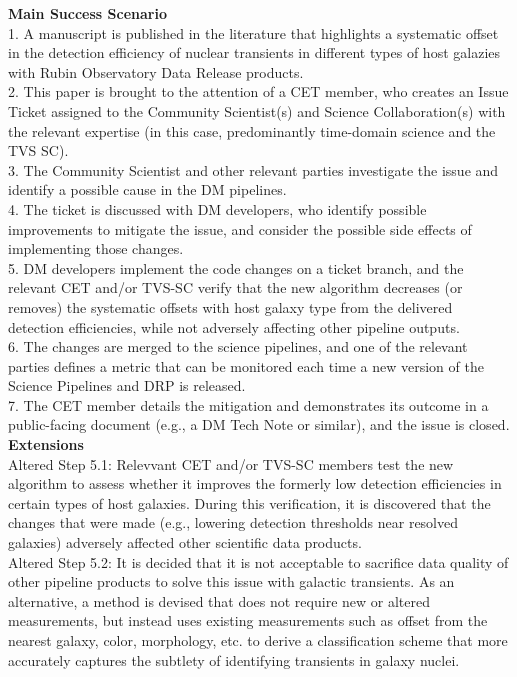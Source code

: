 {\bf Main Success Scenario} \\
1. A manuscript is published in the literature that highlights a systematic offset in the detection efficiency of nuclear transients in different types of host galazies with Rubin Observatory Data Release products. \\
2. This paper is brought to the attention of a CET member, who creates an Issue Ticket assigned to the Community Scientist(s) and Science Collaboration(s) with the relevant expertise (in this case, predominantly time-domain science and the TVS SC). \\
3. The Community Scientist and other relevant parties investigate the issue and identify a possible cause in the DM pipelines. \\
4. The ticket is discussed with DM developers, who identify possible improvements to mitigate the issue, and consider the possible side effects of implementing those changes. \\
5. DM developers implement the code changes on a ticket branch, and the relevant CET and/or TVS-SC verify that the new algorithm decreases (or removes) the systematic offsets with host galaxy type from the delivered detection efficiencies, while not adversely affecting other pipeline outputs. \\
6. The changes are merged to the science pipelines, and one of the relevant parties defines a metric that can be monitored each time a new version of the Science Pipelines and DRP is released. \\
7.  The CET member details the mitigation and demonstrates its outcome in a public-facing document (e.g., a DM Tech Note or similar), and the issue is closed. \\

{\bf Extensions} \\
Altered Step 5.1: Relevvant CET and/or TVS-SC members test the new algorithm to assess whether it improves the formerly low detection efficiencies in certain types of host galaxies.  During this verification, it is discovered that the changes that were made (e.g., lowering detection thresholds near resolved galaxies) adversely affected other scientific data products. \\
Altered Step 5.2: It is decided that it is not acceptable to sacrifice data quality of other pipeline products to solve this issue with galactic transients.  As an alternative, a method is devised that does not require new or altered measurements, but instead uses existing measurements such as offset from the nearest galaxy, color, morphology, etc. to derive a classification scheme that more accurately captures the subtlety of identifying transients in galaxy nuclei. \\

